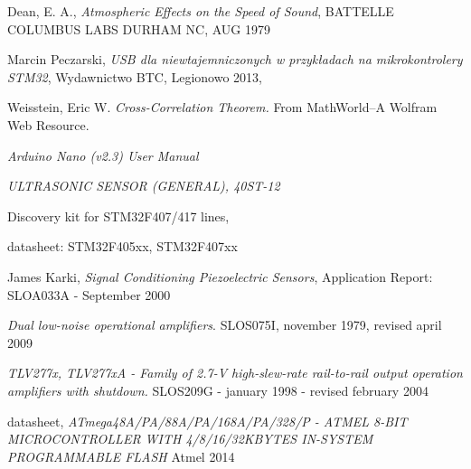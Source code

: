 \begin{thebibliography}{99}


    Dean, E. A., \textit{Atmospheric Effects on the Speed of Sound}, BATTELLE COLUMBUS LABS DURHAM NC, AUG 1979

   Marcin Peczarski, 
  \textit{USB dla niewtajemniczonych w przykładach na mikrokontrolery STM32}, Wydawnictwo BTC, Legionowo 2013,

   Weisstein, Eric W. \textit{Cross-Correlation Theorem.} From MathWorld--A Wolfram Web Resource. 

  \textit{Arduino Nano (v2.3) User Manual}
  
  \textit{ULTRASONIC SENSOR (GENERAL), 40ST-12}

   Discovery kit for STM32F407/417 lines,

   datasheet: STM32F405xx, STM32F407xx 
  
   James Karki, \textit{Signal Conditioning Piezoelectric Sensors}, 
  Application Report: SLOA033A - September 2000

   \textit{Dual low-noise operational amplifiers}. SLOS075I, november 1979, revised april 2009

   \textit{TLV277x, TLV277xA - Family of 2.7-V high-slew-rate rail-to-rail output operation amplifiers with shutdown.}
  SLOS209G - january 1998 - revised february 2004

   datasheet, \textit{ATmega48A/PA/88A/PA/168A/PA/328/P - 
  ATMEL 8-BIT MICROCONTROLLER WITH 4/8/16/32KBYTES IN-SYSTEM PROGRAMMABLE FLASH}
  Atmel 2014


\end{thebibliography}
